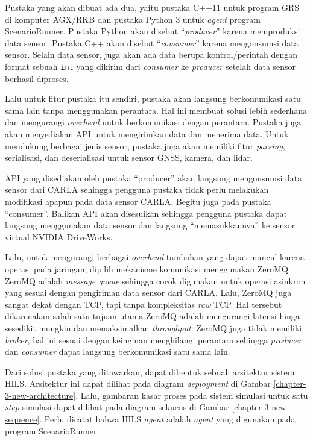Pustaka yang akan dibuat ada dua, yaitu pustaka C++11 untuk program GRS di
komputer AGX/RKB dan pustaka Python 3 untuk \textit{agent} program
ScenarioRunner. Pustaka Python akan disebut ``\textit{producer}'' karena
memproduksi data sensor. Pustaka C++ akan disebut ``\textit{consumer}'' karena
mengonsumsi data sensor. Selain data sensor, juga akan ada data berupa
kontrol/perintah dengan format sebuah \texttt{int} yang dikirim dari
\textit{consumer} ke \textit{producer} setelah data sensor berhasil diproses.

Lalu untuk fitur pustaka itu sendiri, pustaka akan langsung berkomunikasi satu
sama lain tanpa menggunakan perantara. Hal ini membuat solusi lebih sederhana
dan mengurangi \textit{overhead} untuk berkomunikasi dengan perantara. Pustaka
juga akan menyediakan API untuk mengirimkan data dan menerima data. Untuk
mendukung berbagai jenis sensor, pustaka juga akan memiliki fitur
\textit{parsing}, serialisasi, dan deserialisasi untuk sensor GNSS, kamera, dan
lidar.

API yang disediakan oleh pustaka ``producer'' akan langsung mengonsumsi data
sensor dari CARLA sehingga pengguna pustaka tidak perlu melakukan modifikasi
apapun pada data sensor CARLA. Begitu juga pada pustaka ``consumer''. Balikan
API akan disesuikan sehingga pengguna pustaka dapat langsung menggunakan data
sensor dan langsung ``memasukkannya'' ke sensor virtual NVIDIA DriveWorks.

Lalu, untuk mengurangi berbagai \textit{overhead} tambahan yang dapat muncul
karena operasi pada jaringan, dipilih mekanisme komunikasi menggunakan ZeroMQ.
ZeroMQ adalah \textit{message queue} sehingga cocok digunakan untuk operasi
asinkron yang sesuai dengan pengiriman data sensor dari CARLA. Lalu, ZeroMQ juga
sangat dekat dengan TCP, tapi tanpa kompleksitas \textit{raw} TCP. Hal tersebut
dikarenakan salah satu tujuan utama ZeroMQ adalah mengurangi latensi hinga
sesedikit mungkin dan memaksimalkan \textit{throughput}. ZeroMQ juga tidak
memiliki \textit{broker}, hal ini sesuai dengan keinginan menghilangi perantara
sehingga \textit{producer} dan \textit{consumer} dapat langsung berkomunikasi
satu sama lain.

Dari solusi pustaka yang ditawarkan, dapat dibentuk sebuah arsitektur sistem
HILS. Arsitektur ini dapat dilihat pada diagram \textit{deployment} di Gambar
\ref{chapter-3-new-architecture}. Lalu, gambaran kasar proses pada sistem
simulasi untuk satu \textit{step} simulasi dapat dilihat pada diagram
sekuens di Gambar \ref{chapter-3-new-sequence}. Perlu dicatat bahwa HILS
\textit{agent} adalah \textit{agent} yang digunakan pada program
ScenarioRunner.

